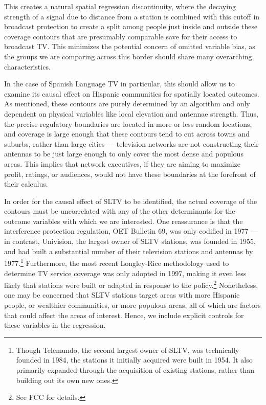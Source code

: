 \documentclass[11pt]{article}
\begin{document}
This creates a natural spatial regression discontinuity, where the decaying strength of a signal due to distance from a station is combined with this cutoff in broadcast protection to create a split among people just inside and outside these coverage contours that are presumably comparable save for their access to broadcast TV.  This minimizes the potential concern of omitted variable bias, as the groups we are comparing across this border should share many overarching characteristics.

In the case of Spanish Language TV in particular, this should allow us to examine its causal effect on Hispanic communities for spatially located outcomes. As mentioned, these contours are purely determined by an algorithm and only dependent on physical variables like local elevation and antennae strength. Thus, the precise regulatory boundaries are located in more or less random locations, and coverage is large enough that these contours tend to cut across towns and suburbs, rather than large cities --- television networks are not constructing their antennas to be just large enough to only cover the most dense and populous areas. This implies that network executives, if they are aiming to maximize profit, ratings, or audiences, would not have these boundaries at the forefront of their calculus.

In order for the causal effect of SLTV to be identified, the actual coverage of the contours must be uncorrelated with any of the other determinants for the outcome variables with which we are interested. One reassurance is that the interference protection regulation, OET Bulletin 69, was only codified in 1977 --- in contrast, Univision, the largest owner of SLTV stations, was founded in 1955, and had built a substantial number of their television stations and antennas by 1977.\footnote{ Though Telemundo, the second largest owner of SLTV, was technically founded in 1984, the stations it initially acquired were built in 1954. It also primarily expanded through the acquisition of existing stations, rather than building out its own new ones. } Furthermore, the most recent Longley-Rice methodology used to determine TV service coverage was only adopted in 1997, making it even less likely that stations were built or adapted in response to the policy.\footnote{ See FCC\cite{noauthor_oet_2004} for details.} Nonetheless, one may be concerned that SLTV stations target areas with more Hispanic people, or wealthier communities, or more populous areas, all of which are factors that could affect the areas of interest. Hence, we include explicit controls for these variables in the regression.
\end{document}
